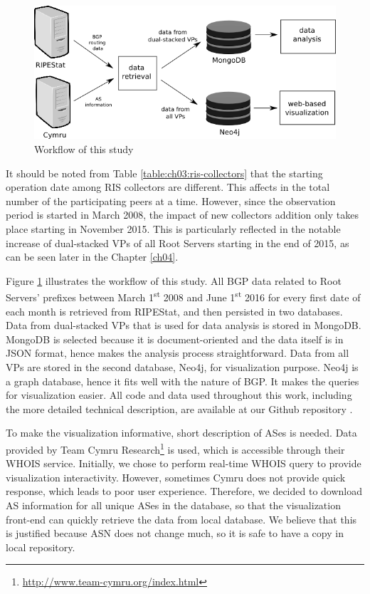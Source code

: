 \begin{figure}
	\centering
	\includegraphics[width=.6\linewidth]{img/configuration}
	\caption{Workflow of this study}
	\label{fig:ch03:config}
\end{figure}

It should be noted from Table \ref{table:ch03:ris-collectors} that the starting operation date among RIS collectors are different. This affects in the total number of the participating peers at a time. However, since the observation period is started in March 2008, the impact of new collectors addition only takes place starting in November 2015. This is particularly reflected in the notable increase of dual-stacked VPs of all Root Servers starting in the end of 2015, as can be seen later in the Chapter \ref{ch04}.

Figure \ref{fig:ch03:config} illustrates the workflow of this study. All BGP data related to Root Servers' prefixes between March 1\textsuperscript{st} 2008 and June 1\textsuperscript{st} 2016 for every first date of each month is retrieved from RIPEStat, and then persisted in two databases. Data from dual-stacked VPs that is used for data analysis is stored in MongoDB. MongoDB is selected because it is document-oriented and the data itself is in JSON format, hence makes the analysis process straightforward. Data from all VPs are stored in the second database, Neo4j, for visualization purpose. Neo4j is a graph database, hence it fits  well with the nature of BGP. It makes the queries for visualization easier. All code and data used throughout this work, including the more detailed technical description, are available at our Github repository \cite{github-thesis}.

To make the visualization informative, short description of ASes is needed. Data provided by Team Cymru Research\footnote{\url{http://www.team-cymru.org/index.html}} is used, which is accessible through their WHOIS service. Initially, we chose to perform real-time WHOIS query to provide visualization interactivity. However, sometimes Cymru does not provide quick response, which leads to poor user experience. Therefore, we decided to download AS information for all unique ASes in the database, so that the visualization front-end can quickly retrieve the data from local database. We believe that this is justified because ASN does not change much, so it is safe to have a copy in local repository.


